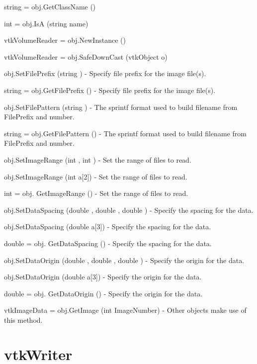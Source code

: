 \begin{DoxyItemize}
\item {\ttfamily string = obj.\-Get\-Class\-Name ()}  
\item {\ttfamily int = obj.\-Is\-A (string name)}  
\item {\ttfamily vtk\-Volume\-Reader = obj.\-New\-Instance ()}  
\item {\ttfamily vtk\-Volume\-Reader = obj.\-Safe\-Down\-Cast (vtk\-Object o)}  
\item {\ttfamily obj.\-Set\-File\-Prefix (string )} -\/ Specify file prefix for the image file(s).  
\item {\ttfamily string = obj.\-Get\-File\-Prefix ()} -\/ Specify file prefix for the image file(s).  
\item {\ttfamily obj.\-Set\-File\-Pattern (string )} -\/ The sprintf format used to build filename from File\-Prefix and number.  
\item {\ttfamily string = obj.\-Get\-File\-Pattern ()} -\/ The sprintf format used to build filename from File\-Prefix and number.  
\item {\ttfamily obj.\-Set\-Image\-Range (int , int )} -\/ Set the range of files to read.  
\item {\ttfamily obj.\-Set\-Image\-Range (int a\mbox{[}2\mbox{]})} -\/ Set the range of files to read.  
\item {\ttfamily int = obj. Get\-Image\-Range ()} -\/ Set the range of files to read.  
\item {\ttfamily obj.\-Set\-Data\-Spacing (double , double , double )} -\/ Specify the spacing for the data.  
\item {\ttfamily obj.\-Set\-Data\-Spacing (double a\mbox{[}3\mbox{]})} -\/ Specify the spacing for the data.  
\item {\ttfamily double = obj. Get\-Data\-Spacing ()} -\/ Specify the spacing for the data.  
\item {\ttfamily obj.\-Set\-Data\-Origin (double , double , double )} -\/ Specify the origin for the data.  
\item {\ttfamily obj.\-Set\-Data\-Origin (double a\mbox{[}3\mbox{]})} -\/ Specify the origin for the data.  
\item {\ttfamily double = obj. Get\-Data\-Origin ()} -\/ Specify the origin for the data.  
\item {\ttfamily vtk\-Image\-Data = obj.\-Get\-Image (int Image\-Number)} -\/ Other objects make use of this method.  
\end{DoxyItemize}\hypertarget{vtkio_vtkwriter}{}\section{vtk\-Writer}\label{vtkio_vtkwriter}
